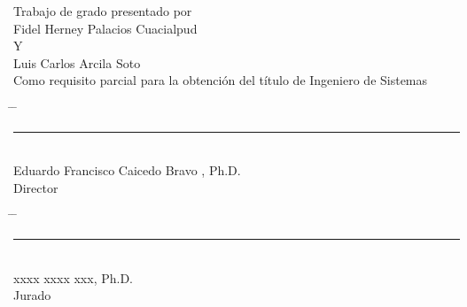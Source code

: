 \vspace*{4cm}
\begin{center}
Trabajo de grado presentado por\\
Fidel Herney Palacios Cuacialpud\\
Y\\
Luis Carlos Arcila Soto\\
Como requisito parcial para la obtención del título de Ingeniero de Sistemas
\end{center}
\vfill
\vfill
\vfill
\begin{center}
\begin{tabbing}
\hspace{0.05\textwidth} \= \hspace{0.05\textwidth} \= \kill
\rule{70mm}{0.1mm} \> \rightline{\rule{70mm}{0.1mm}} \\
Eduardo Francisco Caicedo Bravo , Ph.D. \> \\
Director \> 
\end{tabbing}
\end{center}
\vfill
\vfill
\vfill
\begin{center}
\begin{tabbing}
\hspace{0.05\textwidth} \= \hspace{0.05\textwidth} \= \kill
\rule{70mm}{0.1mm} \> \rightline{\rule{70mm}{0.1mm}} \\
xxxx  xxxx xxx, Ph.D. \> \\
Jurado \> 
\end{tabbing}
\end{center}
\vfill
\vfill
\vfill
\vfill
